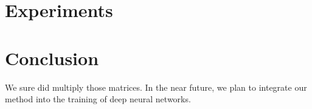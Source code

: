 \documentclass{article}  %
\begin{document}
% 


% 


% 


% 

\section{Experiments}




% 


\section{Conclusion}

We sure did multiply those matrices. In the near future, we plan to integrate our method into the training of deep neural networks.
\end{document}
